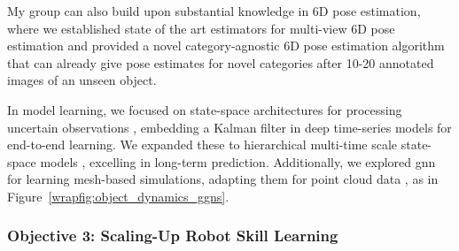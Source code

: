 \documentclass{erc-B2}
\begin{document}
My group can also build upon substantial knowledge in 6D pose estimation, where we established state of the art estimators for multi-view 6D pose estimation \cite{DuffhaussRAL,duffhauss22MV6D} and provided a novel category-agnostic 6D pose estimation algorithm \cite{gao2023sad} that can already give pose estimates for novel categories after  10-20 annotated images of an unseen object. 

In model learning, we focused on state-space architectures for processing uncertain observations \cite{becker19RKN,shaj2020acrkn,shaj2022hiprssm, becker2022uncertainty}, embedding a Kalman filter in deep time-series models for end-to-end learning. We expanded these to hierarchical multi-time scale state-space models \cite{shaj2023mts3}, excelling in long-term prediction. Additionally, we explored \gls*{gnn} for learning mesh-based simulations, adapting them for point cloud data \cite{linkerhagnerFSM23}, as in Figure~\ref{wrapfig:object_dynamics_ggns}. %




\subsubsection{Objective 3: Scaling-Up Robot Skill Learning}
\end{document}
